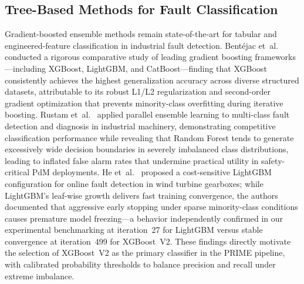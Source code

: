 \documentclass[conference]{IEEEtran}
\begin{document}
\subsection{Tree-Based Methods for Fault Classification}
Gradient-boosted ensemble methods remain state-of-the-art for tabular and
engineered-feature classification in industrial fault detection.
Bent\'{e}jac et~al.\ \cite{chen2016xgboost} conducted a rigorous comparative
study of leading gradient boosting frameworks---including XGBoost, LightGBM,
and CatBoost---finding that XGBoost consistently achieves the highest
generalization accuracy across diverse structured datasets, attributable to
its robust L1/L2 regularization and second-order gradient optimization that
prevents minority-class overfitting during iterative boosting. Rustam
et~al.\ \cite{breiman2001rf} applied parallel ensemble learning to multi-class
fault detection and diagnosis in industrial machinery, demonstrating
competitive classification performance while revealing that Random Forest tends
to generate excessively wide decision boundaries in severely imbalanced class
distributions, leading to inflated false alarm rates that undermine practical
utility in safety-critical PdM deployments. He et~al.\ \cite{ke2017lightgbm}
proposed a cost-sensitive LightGBM configuration for online fault detection
in wind turbine gearboxes; while LightGBM's leaf-wise growth delivers fast
training convergence, the authors documented that aggressive early stopping
under sparse minority-class conditions causes premature model freezing---a
behavior independently confirmed in our experimental benchmarking at
iteration~27 for LightGBM versus stable convergence at iteration~499 for
XGBoost~V2. These findings directly motivate the selection of XGBoost~V2
as the primary classifier in the PRIME pipeline, with calibrated probability
thresholds to balance precision and recall under extreme imbalance.
\end{document}
